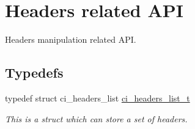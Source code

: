 \hypertarget{group__HEADERS}{
\section{Headers related API}
\label{group__HEADERS}
}


Headers manipulation related API.  
\subsection*{Typedefs}
\begin{DoxyCompactItemize}
\item 
typedef struct ci\_\-headers\_\-list \hyperlink{group__HEADERS_gaaa203ac92dd0242ab66f4237548d7260}{ci\_\-headers\_\-list\_\-t}
\begin{DoxyCompactList}\small\item\em This is a struct which can store a set of headers. \item\end{DoxyCompactList}\end{DoxyCompactItemize}
